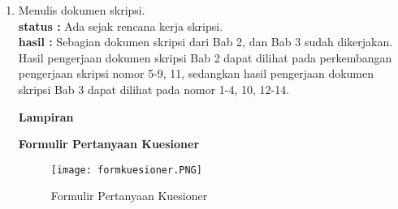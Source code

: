 \documentclass[a4paper,twoside]{article}
\begin{document}
\begin{enumerate}
\textbf{Tampilan Kategori Pemilihan Nama Baptis}
		
		Pada tampilan kategori pemilihan nama baptis (Gambar \ref{fig:pemilihan}: Tampilan Kategori Pemilihan Nama Baptis), terdapat berbagai macam pilihan kategori untuk memilih nama baptis yang tepat untuk seorang calon baptis yang ingin dibaptis. Kategori tersebut terdiri dari:
		
		\begin{itemize}
			\item Arti Nama Santo-Santa
			\item Deskripsi (Cerita Kehidupan) Santo-Santa
			\item Tanggal Lahir Calon Baptis
			\item Tanggal Pembaptisan Calon Baptis
			\item Profesi Santo-Santa
			\item Lambang Santo-Santa
			\item Tanggal Pesta Santo-Santa (tanggal peringatan)
		\end{itemize}
		
		Selain kategori tersebut, terdapat juga sebuah \textit{button} yang berguna untuk mencari nama baptis, berdasarkan kategori yang telah dicari oleh calon baptis (\textit{user}). Setelah \textit{user} menekan \textit{button} cari, maka akan keluar sebuah \textit{output}, yang mendekati atau sama dengan yang diinginkan oleh \textit{user}.
\begin{figure}[htbp]
		\centering
			\texttt{[image: 4.PNG]}
			\caption{Tampilan Kategori Pemilihan Nama Baptis}
		\label{fig:pemilihan}
	\end{figure}

\item Menulis dokumen skripsi.\\
		{\bf status :} Ada sejak rencana kerja skripsi.\\
		{\bf hasil :} Sebagian dokumen skripsi dari Bab 2, dan Bab 3 sudah dikerjakan. Hasil pengerjaan dokumen skripsi Bab 2 dapat dilihat pada perkembangan pengerjaan skripsi nomor 5-9, 11, sedangkan hasil pengerjaan dokumen skripsi Bab 3 dapat dilihat pada nomor 1-4, 10, 12-14.





\textbf{Lampiran}

\textbf{Formulir Pertanyaan Kuesioner}

\begin{figure}[htbp]
		\centering
			\texttt{[image: formkuesioner.PNG]}
			\caption{Formulir Pertanyaan Kuesioner}
		\label{fig:formkuesioner}
	\end{figure}



\end{enumerate}
\end{document}
